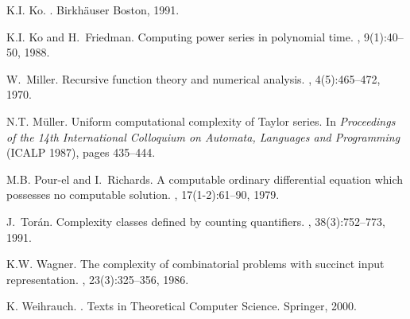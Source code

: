 \documentclass[envcountsame]{llncs}
\begin{document}
\begin{thebibliography}{10}
K.I. Ko.
.
\newblock Birkh{\"a}user Boston, 1991.

K.I. Ko and H.~Friedman.
\newblock Computing power series in polynomial time.
, 9(1):40--50, 1988.

W.~Miller.
\newblock Recursive function theory and numerical analysis.
, 4(5):465--472, 1970.

N.T. M{\"u}ller.
\newblock Uniform computational complexity of {T}aylor series.
\newblock In {\em Proceedings of the 14th International Colloquium on Automata, Languages and Programming} (ICALP 1987), pages 435--444.

M.B. Pour-el and I.~Richards.
\newblock A computable ordinary differential equation which possesses no
  computable solution.
, 17(1-2):61--90, 1979.

J.~Tor{\'a}n.
\newblock Complexity classes defined by counting quantifiers.
, 38(3):752--773, 1991.

K.W. Wagner.
\newblock The complexity of combinatorial problems with succinct input
  representation.
, 23(3):325--356, 1986.

K. Weihrauch.
.
\newblock Texts in Theoretical Computer Science. Springer, 2000.

\end{thebibliography}
\end{document}
